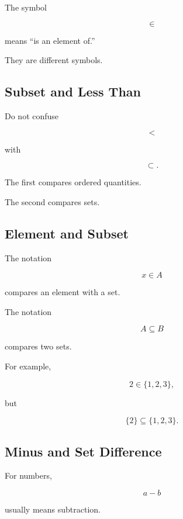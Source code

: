 The symbol

\[
\boxed{
\in
}
\]

means ``is an element of.''

They are different symbols.

\subsection{Subset and Less Than}
\label{subsec:subset-less-than-confusion}

Do not confuse

\[
\boxed{
<
}
\]

with

\[
\boxed{
\subset.
}
\]

The first compares ordered quantities.

The second compares sets.

\subsection{Element and Subset}
\label{subsec:element-subset-confusion}

The notation

\[
\boxed{
x\in A
}
\]

compares an element with a set.

The notation

\[
\boxed{
A\subseteq B
}
\]

compares two sets.

For example,

\[
\boxed{
2\in\{1,2,3\},
}
\]

but

\[
\boxed{
\{2\}\subseteq\{1,2,3\}.
}
\]

\subsection{Minus and Set Difference}
\label{subsec:minus-set-difference}

For numbers,

\[
a-b
\]

usually means subtraction.

